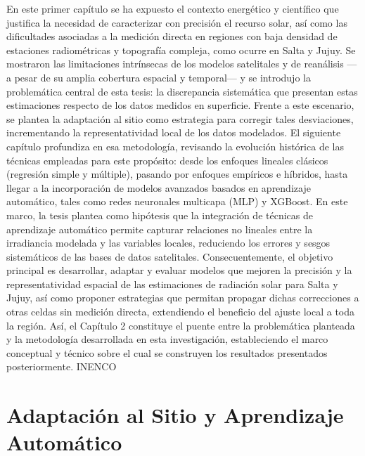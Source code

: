 \documentclass[letterpaper,12pt, twoside]{report}
\makeatletter
\let\newtitle\@title
\providecommand{\DIFdeltex}[1]{{\protect\color{red} \scriptsize #1}} %
\providecommand{\DIFaddbegin}{} %
\providecommand{\DIFaddend}{} %
\providecommand{\DIFdelbegin}{} %
\providecommand{\DIFdelend}{} %
\providecommand{\DIFdel}[1]{\texorpdfstring{\DIFdeltex{#1}}{}} %
\newcommand{\DIFscaledelfig}{0.5}
\newlength{\DIFdelgraphicswidth} %
\newlength{\DIFdelgraphicsheight} %
\newcommand{\DIFaddincludegraphics}[2][]{{\color{blue}\fbox{\DIFOincludegraphics[#1]{#2}}}} %
\newcommand{\DIFdelincludegraphics}[2][]{%
\sbox{\DIFdelgraphicsbox}{\DIFOincludegraphics[#1]{#2}}%
\settoboxwidth{\DIFdelgraphicswidth}{\DIFdelgraphicsbox} %
\settoboxtotalheight{\DIFdelgraphicsheight}{\DIFdelgraphicsbox} %
\scalebox{\DIFscaledelfig}{%
\parbox[b]{\DIFdelgraphicswidth}{\usebox{\DIFdelgraphicsbox}\\[-\baselineskip] \rule{\DIFdelgraphicswidth}{0em}}\llap{\resizebox{\DIFdelgraphicswidth}{\DIFdelgraphicsheight}{%
\setlength{\unitlength}{\DIFdelgraphicswidth}%
\begin{picture}(1,1)%
\thicklines\linethickness{2pt} %
{\color[rgb]{1,0,0}\put(0,0){\framebox(1,1){}}}%
{\color[rgb]{1,0,0}\put(0,0){\line( 1,1){1}}}%
{\color[rgb]{1,0,0}\put(0,1){\line(1,-1){1}}}%
\end{picture}%
}\hspace*{3pt}}} %
} %
\DeclareRobustCommand{\DIFaddbegin}{\DIFOaddbegin \let\includegraphics\DIFaddincludegraphics} %
\DeclareRobustCommand{\DIFaddend}{\DIFOaddend \let\includegraphics\DIFOincludegraphics} %
\DeclareRobustCommand{\DIFdelbegin}{\DIFOdelbegin \let\includegraphics\DIFdelincludegraphics} %
\DeclareRobustCommand{\DIFdelend}{\DIFOaddend \let\includegraphics\DIFOincludegraphics} %
\makeatother
\begin{document}
\DIFdel{En este primer capítulo se ha expuesto el contexto energético y científico que justifica la necesidad de caracterizar con precisión el recurso solar, así como las dificultades asociadas a la medición directa en regiones con baja densidad de estaciones radiométricas y topografía compleja, como ocurre en Salta y Jujuy. Se mostraron las limitaciones intrínsecas de los modelos satelitales y de reanálisis —a pesar de su amplia cobertura espacial y temporal— y se introdujo la problemática central de esta tesis: la discrepancia sistemática que presentan estas estimaciones respecto de los datos medidos en superficie. Frente a este escenario, se plantea la adaptación al sitio como estrategia para corregir tales desviaciones, incrementando la representatividad local de los datos modelados. El siguiente capítulo profundiza en esa metodología, revisando la evolución histórica de las técnicas empleadas para este propósito: desde los enfoques lineales clásicos (regresión simple y múltiple), pasando por enfoques empíricos e híbridos, hasta llegar a la incorporación de modelos avanzados basados en aprendizaje automático, tales como redes neuronales multicapa (MLP) y XGBoost. En este marco, la tesis plantea como hipótesis que la integración de técnicas de aprendizaje automático permite capturar relaciones no lineales entre la irradiancia modelada y las variables locales, reduciendo los errores y sesgos sistemáticos de las bases de datos satelitales. Consecuentemente, el objetivo principal es desarrollar, adaptar y evaluar modelos que mejoren la precisión y la representatividad espacial de las estimaciones de radiación solar para Salta y Jujuy, así como proponer estrategias que permitan propagar dichas correcciones a otras celdas sin medición directa, extendiendo el beneficio del ajuste local a toda la región. Así, el Capítulo 2 constituye el puente entre la problemática planteada y la metodología desarrollada en esta investigación, estableciendo el marco conceptual y técnico sobre el cual se construyen los resultados presentados posteriormente. }%
\DIFdelend \DIFaddbegin  \DIFaddend %
\DIFdelbegin %
\DIFdel{INENCO}%

\chapter{\DIFdel{Adaptación al Sitio y Aprendizaje Automático}}%
\addtocounter{chapter}{-1}%
\end{document}
